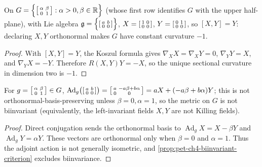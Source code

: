 \begin{example}
  \label{ex:pet-ch4-hyperbolic-lie-group}
  On $G=\Big\{\begin{bsmallmatrix}\alpha&\beta\\0&1\end{bsmallmatrix}:\alpha>0,\beta\in\mathbb{R}\Big\}$
  (whose first row identifies $G$ with the upper half-plane), with Lie algebra
  $\mathfrak g=\Big\{\begin{bsmallmatrix}a&b\\0&0\end{bsmallmatrix}\Big\}$,
  $X=\begin{bsmallmatrix}1&0\\0&0\end{bsmallmatrix}$,
  $Y=\begin{bsmallmatrix}0&1\\0&0\end{bsmallmatrix}$, so $[X,Y]=Y$: declaring
  $X,Y$ orthonormal makes $G$ have constant curvature $-1$.
\end{example}
\begin{proof}
  \sketch
  With $[X,Y]=Y$, the Koszul formula gives
  $\nabla_XX=\nabla_XY=0$, $\nabla_YY=X$, and $\nabla_YX=-Y$. Therefore
  $R(X,Y)Y=-X$, so the unique sectional curvature in dimension two is $-1$.
\end{proof}

\begin{proposition}
  \label{prop:pet-ch4-hyperbolic-lie-group-not-biinvariant}
  For $g=\begin{bsmallmatrix}\alpha&\beta\\0&1\end{bsmallmatrix}\in G$,
  $\mathrm{Ad}_g\big(\begin{bsmallmatrix}a&b\\0&0\end{bsmallmatrix}\big)
  =\begin{bsmallmatrix}a&-a\beta+b\alpha\\0&0\end{bsmallmatrix}=aX+(-a\beta+b\alpha)Y$;
  this is not orthonormal-basis-preserving unless $\beta=0,\alpha=1$, so the
  metric on $G$ is not biinvariant (equivalently, the left-invariant fields
  $X,Y$ are not Killing fields).
\end{proposition}
\begin{proof}
  \sketch
  Direct conjugation sends the orthonormal basis to
  $\operatorname{Ad}_gX=X-\beta Y$ and
  $\operatorname{Ad}_gY=\alpha Y$. These vectors are orthonormal only when
  $\beta=0$ and $\alpha=1$. Thus the adjoint action is not generally isometric,
  and \cref{prop:pet-ch4-biinvariant-criterion} excludes biinvariance.
\end{proof}

